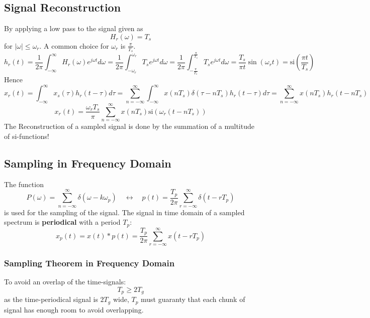 \documentclass[10pt,a4paper]{article}
\begin{document}
\subsection{Signal Reconstruction}
By applying a low pass to the signal given as $$H_r(\omega) = T_s$$ for $\vert \omega \vert \leq \omega_r$. A common choice for $\omega_r$ is $\frac{\pi}{T_s}$.
$$
h_r(t) = \frac{1}{2\pi} \int_{-\infty}^{\infty} H_r(\omega)e^{j\omega t} d\omega
	   = \frac{1}{2\pi} \int_{-\omega_r}^{\omega_r} T_se^{j\omega t} d\omega
	   = \frac{1}{2\pi} \int_{-\frac{\pi}{T_s}}^{\frac{\pi}{T_s}} T_se^{j\omega t} d\omega
	   = \frac{T_s}{\pi t} \sin(\omega_r t)
	   = \text{si}(\frac{\pi t}{T_s})
$$
Hence
$$
x_r(t) = \int_{-\infty}^{\infty} x_s(\tau) h_r(t-\tau)d\tau
	   = \sum_{n=-\infty}^{\infty} \int_{-\infty}^{\infty} x(nT_s) \delta(\tau-nT_s)h_r(t-\tau) d\tau
	   = \sum_{n=-\infty}^{\infty} x(nT_s) h_r(t-nT_s)
$$
$$
\boxed{
x_r(t) = \frac{\omega_rT_s}{\pi} \sum_{n=-\infty}^{\infty} x(nT_s) \text{si}(\omega_r(t-nT_s))
}
$$
The Reconstruction of a sampled signal is done by the summation of a multitude of si-functions!

\subsection{Sampling in Frequency Domain}
The function 
$$
P(\omega) = \sum_{n=-\infty}^{\infty} \delta(\omega-k\omega_p) \quad
\leftrightarrow \quad
p(t) = \frac{T_p}{2\pi} \sum_{r=-\infty}^{\infty} \delta(t-rT_p)
$$
is used for the sampling of the signal. The signal in time domain of a sampled spectrum is \textbf{periodical} with a period $T_p$:
$$
x_p(t) = x(t) * p(t) = \frac{T_p}{2\pi} \sum_{r=-\infty}^{\infty} x(t - rT_p)
$$
\subsubsection{Sampling Theorem in Frequency Domain}
To avoid an overlap of the time-signals:
$$
\boxed{ T_p \geq 2T_g }
$$
as the time-periodical signal is $2T_g$ wide, $T_p$ must guaranty that each chunk of signal has enough room to avoid overlapping. 
\end{document}
